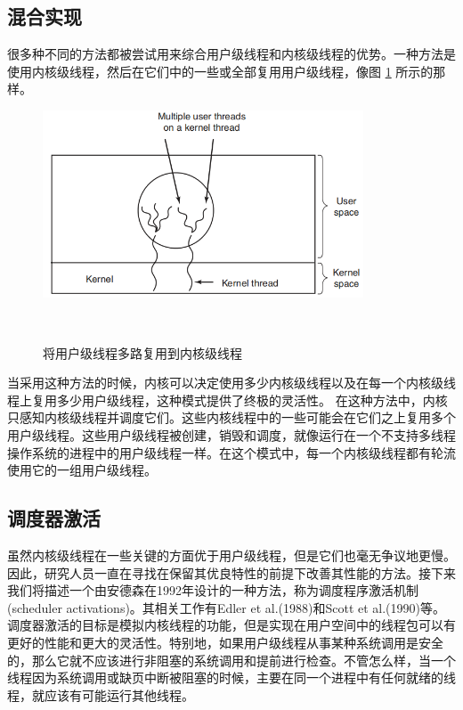 	\subsection{混合实现}
	
	很多种不同的方法都被尝试用来综合用户级线程和内核级线程的优势。一种方法是使用内核级线程，然后在它们中的一些或全部复用用户级线程，像图 \ref{fig:multiplexthreads} 所示的那样。
	
	\begin{figure}[ht]\small
		\centering
		\includegraphics[width=0.85\textwidth]{FIG/2-17.png}
		\caption{将用户级线程多路复用到内核级线程}　\label{fig:multiplexthreads}
	\end{figure}
	
	当采用这种方法的时候，内核可以决定使用多少内核级线程以及在每一个内核级线程上复用多少用户级线程，这种模式提供了终极的灵活性。
	在这种方法中，内核只感知内核级线程并调度它们。这些内核线程中的一些可能会在它们之上复用多个用户级线程。这些用户级线程被创建，销毁和调度，就像运行在一个不支持多线程操作系统的进程中的用户级线程一样。在这个模式中，每一个内核级线程都有轮流使用它的一组用户级线程。
	
	\subsection{调度器激活}
	
	虽然内核级线程在一些关键的方面优于用户级线程，但是它们也毫无争议地更慢。因此，研究人员一直在寻找在保留其优良特性的前提下改善其性能的方法。接下来我们将描述一个由安德森在1992年设计的一种方法，称为调度程序激活机制(scheduler activations)。其相关工作有Edler et al.(1988)和Scott et al.(1990)等。
	调度器激活的目标是模拟内核线程的功能，但是实现在用户空间中的线程包可以有更好的性能和更大的灵活性。特别地，如果用户级线程从事某种系统调用是安全的，那么它就不应该进行非阻塞的系统调用和提前进行检查。不管怎么样，当一个线程因为系统调用或缺页中断被阻塞的时候，主要在同一个进程中有任何就绪的线程，就应该有可能运行其他线程。
	
